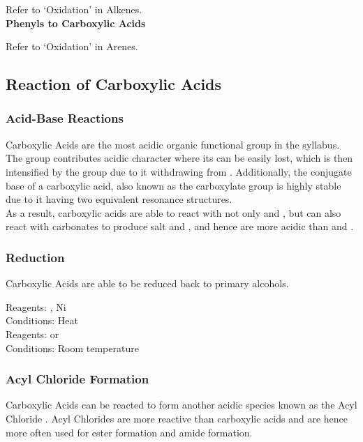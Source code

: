 \documentclass[../main]{subfiles}
\begin{document}
	Refer to `Oxidation' in Alkenes. \\ 

	\noindent \textbf{Phenyls to Carboxylic Acids}

	Refer to `Oxidation' in Arenes. \\ 

	\subsection{Reaction of Carboxylic Acids}

	\subsubsection{Acid-Base Reactions}

	Carboxylic Acids are the most acidic organic functional group in the syllabus. The  group contributes acidic character where its  can be easily lost, which is then intensified by the  group due to it withdrawing  from . Additionally, the conjugate base of a carboxylic acid, also known as the carboxylate group  is highly stable due to it having two equivalent resonance structures. \\

	As a result, carboxylic acids are able to react with not only  and , but can also react with carbonates to produce salt and , and hence are more acidic than  and . \\

	\subsubsection{Reduction}

	Carboxylic Acids are able to be reduced back to primary alcohols.

	Reagents: , Ni \\
	Conditions: Heat \\

	Reagents:  or \\
	Conditions: Room temperature \\

	\subsubsection{Acyl Chloride Formation}

	Carboxylic Acids can be reacted to form another acidic species known as the Acyl Chloride . Acyl Chlorides are more reactive than carboxylic acids and are hence more often used for ester formation and amide formation.
\end{document}
